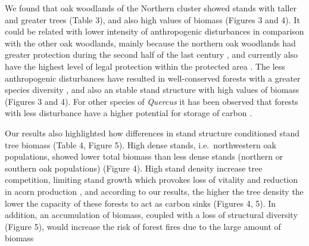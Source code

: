 We found that oak woodlands of the Northern cluster showed stands with taller and greater trees (Table 3), and also high values of biomass (Figures 3 and 4). It could be related with lower intensity of anthropogenic disturbances in comparison with the other oak woodlands, mainly because the northern oak woodlands had greater protection during the second half of the last century \autocite{JimenezOlivencia1991PaisajesSierra}, and currently also have the highest level of legal protection within the protected area \autocite{Anonymous2011Decreto238}. The less anthropogenic disturbances have resulted in well-conserved forests with a greater species diversity \autocite{PerezLuqueetal2021EcologicalDiversity}, and also an stable stand structure with high values of biomass (Figures 3 and 4). For other species of \emph{Quercus} it has been observed that forests with less disturbance have a higher potential for storage of carbon \autocite{BalboaMuriasetal2006CarbonNutrient,Cotillasetal2016AbovegroundBelowground,Stojanovicetal2017ForecastingTree}.

Our results also highlighted how differences in stand structure conditioned stand tree biomass (Table 4, Figure 5). High dense stands, i.e.~northwestern oak populations, showed lower total biomass than less dense stands (northern or southern oak populations) (Figure 4). High stand density increase tree competition, limiting stand growth which provokes loss of vitality and reduction in acorn production \autocite{Bravoetal2008SelviculturaMontes,Piqueetal2018Spain}, and according to our results, the higher the tree density the lower the capacity of these forests to act as carbon sinks (Figures 4, 5). In addition, an accumulation of biomass, coupled with a loss of structural diversity (Figure 5), would increase the risk of forest fires due to the large amount of biomass \autocite{Canellasetal2004GrowthResponse,PiqueVericat2015EvolutionPerspectives,Serradaetal1992CoppiceSystem}

